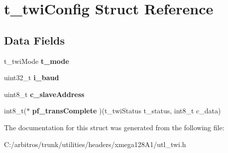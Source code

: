 \hypertarget{structt__twi_config}{\section{t\-\_\-twi\-Config Struct Reference}
\label{structt__twi_config}
}
\subsection*{Data Fields}
\begin{DoxyCompactItemize}
\item 
\hypertarget{structt__twi_config_a81139b4cba41cb09af36192f44bd93ba}{t\-\_\-twi\-Mode {\bfseries t\-\_\-mode}}\label{structt__twi_config_a81139b4cba41cb09af36192f44bd93ba}

\item 
\hypertarget{structt__twi_config_a444c872c66b8a3be0e001b5c8bf2657c}{uint32\-\_\-t {\bfseries i\-\_\-baud}}\label{structt__twi_config_a444c872c66b8a3be0e001b5c8bf2657c}

\item 
\hypertarget{structt__twi_config_a142d12bf388a5c04989e0ae12795ecd7}{uint8\-\_\-t {\bfseries c\-\_\-slave\-Address}}\label{structt__twi_config_a142d12bf388a5c04989e0ae12795ecd7}

\item 
\hypertarget{structt__twi_config_a0761c7b5d5429003e826a2262ac4591c}{int8\-\_\-t($\ast$ {\bfseries pf\-\_\-trans\-Complete} )(t\-\_\-twi\-Status t\-\_\-status, int8\-\_\-t c\-\_\-data)}\label{structt__twi_config_a0761c7b5d5429003e826a2262ac4591c}

\end{DoxyCompactItemize}


The documentation for this struct was generated from the following file\-:\begin{DoxyCompactItemize}
\item 
C\-:/arbitros/trunk/utilities/headers/xmega128\-A1/utl\-\_\-twi.\-h\end{DoxyCompactItemize}
